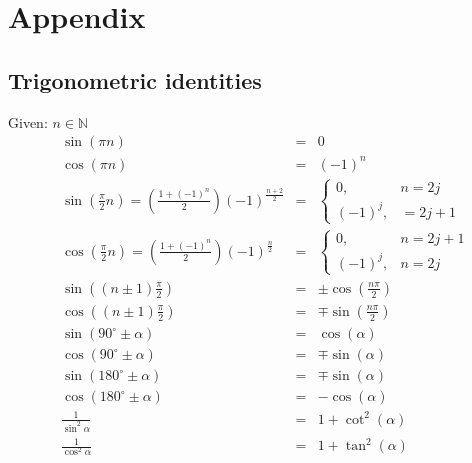\section{Appendix}
\subsection{Trigonometric identities}
Given: $n \in \mathbb{N}$
\begin{align*}
     & \sin(\pi n)                                                                      & = & 0                                                       \\
     & \cos(\pi n)                                                                      & = & {(-1)}^n                                                \\
     & \sin(\frac{\pi}{2}n) = \left(\frac{1 + {(-1)}^n}{2}\right){(-1)}^{\frac{n+2}{2}} & = & \begin{cases} 0, &n=2j \\ {(-1)}^j,&=2j+1 \end{cases}   \\
     & \cos(\frac{\pi}{2}n) = \left(\frac{1+{(-1)}^n}{2}\right){(-1)}^{\frac{n}{2}}     & = & \begin{cases} 0, &n=2j+1 \\ {(-1)}^j, &n=2j \end{cases} \\
     & \sin\left(\left(n\pm 1\right)\frac{\pi}{2}\right)                                & = & \pm \cos\left(\frac{n\pi}{2}\right)                     \\
     & \cos\left(\left(n\pm 1\right)\frac{\pi}{2}\right)                                & = & \mp \sin\left(\frac{n\pi}{2}\right)                     \\
     & \sin(90^\circ\pm\alpha)                                                          & = & \cos(\alpha)                                            \\
     & \cos(90^\circ\pm\alpha)                                                          & = & \mp\sin(\alpha)                                         \\
     & \sin(180^\circ\pm\alpha)                                                         & = & \mp\sin(\alpha)                                         \\
     & \cos(180^\circ\pm\alpha)                                                         & = & -\cos(\alpha)                                           \\
     & \frac{1}{\sin^2 \alpha}                                                          & = & 1+\cot^2 (\alpha)                                       \\
     & \frac{1}{\cos^2 \alpha}                                                          & = & 1+\tan^2 (\alpha)                                       \\
\end{align*}

